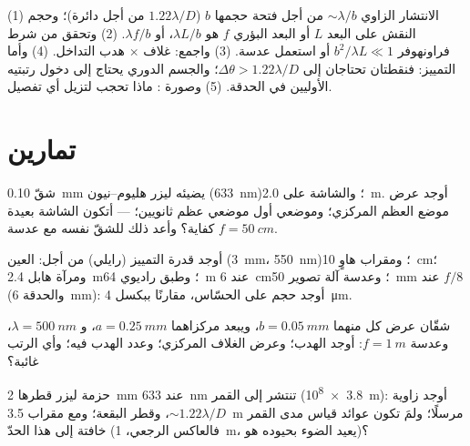 \begin{method}\label{met:b2:diffraction:method}
(1) الانتشار الزاوي $\sim\lambda/b$ من أجل فتحة حجمها $b$ ($1.22\lambda/D$ من أجل
دائرة)؛ وحجم النقش على البعد $L$ أو البعد البؤري $f$ هو
$\lambda L/b$، أو $\lambda f/b$. (2) وتحقق من شرط فراونهوفر $b^2/\lambda L \ll 1$ أو
استعمل عدسة. (3) واجمع: غلاف  $\times$ هدب
التداخل. (4) وأما التمييز: فنقطتان تحتاجان إلى $\Delta\theta > 1.22\lambda/D$؛ والجسم الدوري
يحتاج إلى دخول رتبتيه الأوليين في الحدقة. (5) وصورة : ماذا تحجب لتزيل أي تفصيل.
\end{method}

\section{تمارين}

\begin{exercise}[$\star$]\label{exo:b2:diffraction:1}
شقّ \qty{0.10}{mm} يضيئه ليزر هليوم--نيون (\qty{633}{nm})؛ والشاشة على
\qty{2.0}{m}. أوجد عرض موضع العظم المركزي؛ وموضعي أول موضعي عظم
ثانويين؛  --- أتكون الشاشة بعيدة كفاية؟ وأعد ذلك للشقّ
نفسه مع عدسة $f = \qty{50}{cm}$.
\end{exercise}

\begin{exercise}[$\star$]\label{exo:b2:diffraction:2}
أوجد قدرة التمييز (رايلي) من أجل: العين (\qty{3}{mm}، \qty{550}{nm})؛ ومقراب
هاوٍ \qty{10}{cm}؛ ومرآة هابل \qty{2.4}{m}؛ وطبق راديوي \qty{64}{m}
عند \qty{6}{cm}؛ وعدسة آلة تصوير \qty{50}{mm} عند $f/8$ (والحدقة \qty{6}{mm}):
أوجد حجم  على الحسّاس، مقارنًا ببكسل \qty{4}{\micro m}.
\end{exercise}

\begin{exercise}[$\star$]\label{exo:b2:diffraction:3}
شقّان عرض كل منهما $b = \qty{0.05}{mm}$، ويبعد مركزاهما $a = \qty{0.25}{mm}$، و $\lambda =
\qty{500}{nm}$، وعدسة $f = \qty{1}{m}$: أوجد  الهدب؛ وعرض الغلاف
المركزي؛ وعدد الهدب فيه؛ وأي الرتب غائبة؟
\end{exercise}

\begin{exercise}[$\star$]\label{exo:b2:diffraction:4}
حزمة ليزر قطرها \qty{2}{mm} عند \qty{633}{nm} تنتشر إلى القمر
(\qty{3.8e8}{m}): أوجد زاوية  $\sim1.22\lambda/D$، وقطر البقعة؛
ومع مقراب \qty{3.5}{m} مرسلًا؛ ولمَ تكون عوائد قياس مدى القمر
خافتة إلى هذا الحدّ (فالعاكس الرجعي، \qty{1}{m}، يعيد الضوء بحيوده
هو)؟
\end{exercise}

